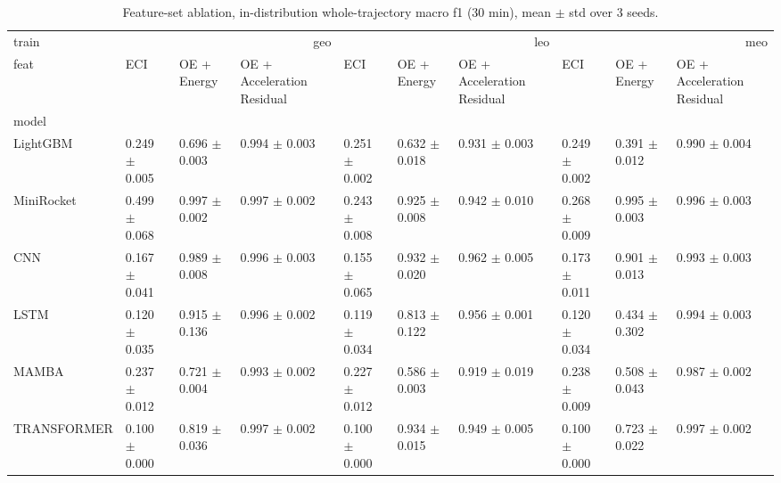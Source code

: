 \begin{table}
\caption{Feature-set ablation, in-distribution whole-trajectory macro f1 (30 min), mean $\pm$ std over 3 seeds.}
\label{tab:total_feat_f1}
\begin{tabular}{llllllllll}
\toprule
train & \multicolumn{3}{r}{geo} & \multicolumn{3}{r}{leo} & \multicolumn{3}{r}{meo} \\
feat & ECI & OE + Energy & OE + Acceleration Residual & ECI & OE + Energy & OE + Acceleration Residual & ECI & OE + Energy & OE + Acceleration Residual \\
model &  &  &  &  &  &  &  &  &  \\
\midrule
LightGBM & 0.249 $\pm$ 0.005 & 0.696 $\pm$ 0.003 & 0.994 $\pm$ 0.003 & 0.251 $\pm$ 0.002 & 0.632 $\pm$ 0.018 & 0.931 $\pm$ 0.003 & 0.249 $\pm$ 0.002 & 0.391 $\pm$ 0.012 & 0.990 $\pm$ 0.004 \\
MiniRocket & 0.499 $\pm$ 0.068 & 0.997 $\pm$ 0.002 & 0.997 $\pm$ 0.002 & 0.243 $\pm$ 0.008 & 0.925 $\pm$ 0.008 & 0.942 $\pm$ 0.010 & 0.268 $\pm$ 0.009 & 0.995 $\pm$ 0.003 & 0.996 $\pm$ 0.003 \\
CNN & 0.167 $\pm$ 0.041 & 0.989 $\pm$ 0.008 & 0.996 $\pm$ 0.003 & 0.155 $\pm$ 0.065 & 0.932 $\pm$ 0.020 & 0.962 $\pm$ 0.005 & 0.173 $\pm$ 0.011 & 0.901 $\pm$ 0.013 & 0.993 $\pm$ 0.003 \\
LSTM & 0.120 $\pm$ 0.035 & 0.915 $\pm$ 0.136 & 0.996 $\pm$ 0.002 & 0.119 $\pm$ 0.034 & 0.813 $\pm$ 0.122 & 0.956 $\pm$ 0.001 & 0.120 $\pm$ 0.034 & 0.434 $\pm$ 0.302 & 0.994 $\pm$ 0.003 \\
MAMBA & 0.237 $\pm$ 0.012 & 0.721 $\pm$ 0.004 & 0.993 $\pm$ 0.002 & 0.227 $\pm$ 0.012 & 0.586 $\pm$ 0.003 & 0.919 $\pm$ 0.019 & 0.238 $\pm$ 0.009 & 0.508 $\pm$ 0.043 & 0.987 $\pm$ 0.002 \\
TRANSFORMER & 0.100 $\pm$ 0.000 & 0.819 $\pm$ 0.036 & 0.997 $\pm$ 0.002 & 0.100 $\pm$ 0.000 & 0.934 $\pm$ 0.015 & 0.949 $\pm$ 0.005 & 0.100 $\pm$ 0.000 & 0.723 $\pm$ 0.022 & 0.997 $\pm$ 0.002 \\
\bottomrule
\end{tabular}
\end{table}
